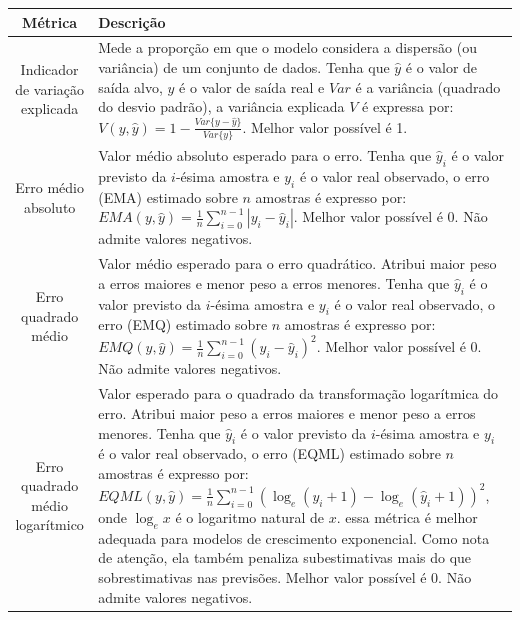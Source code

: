\begin{tabularx}{\linewidth}{c|X}
\caption{Métricas de avaliação do algoritmo de regressão.}\label{t.regression_metrics}\\
\toprule
\textbf{Métrica} & \textbf{Descrição}\\[6pt]
\midrule
\endhead
	{Indicador de variação explicada} & {Mede a proporção em que o modelo considera a dispersão (ou variância) de um conjunto de dados. Tenha que $\widehat{y}$ é o valor de saída alvo, $y$ é o valor de saída real e $Var$ é a variância (quadrado do desvio padrão), a variância explicada $V$ é expressa por: $V(y,\widehat{y}) = 1 - \frac{Var\{y-\widehat{y}\}}{Var\{y\}}$. Melhor valor possível é 1.}\\\hline

	{Erro médio absoluto} & {Valor médio absoluto esperado para o erro. Tenha que $\widehat{y}_i$ é o valor previsto da $i$-ésima amostra e $y_i$ é o valor real observado, o erro (EMA) estimado sobre $n$ amostras é expresso por: $EMA(y,\widehat{y}) = \frac{1}{n} \sum_{i=0}^{n-1} |y_i-\widehat{y}_i|$. Melhor valor possível é 0. Não admite valores negativos.}\\\hline

	{Erro quadrado médio} & {Valor médio esperado para o erro quadrático. Atribui maior peso a erros maiores e menor peso a erros menores. Tenha que $\widehat{y}_i$ é o valor previsto da $i$-ésima amostra e $y_i$ é o valor real observado, o erro (EMQ) estimado sobre $n$ amostras é expresso por: $EMQ(y,\widehat{y}) = \frac{1}{n} \sum_{i=0}^{n-1} (y_i-\widehat{y}_i)^2$. Melhor valor possível é 0. Não admite valores negativos.}\\\hline

	{Erro quadrado médio logarítmico} & {Valor esperado para o quadrado da transformação logarítmica do erro. Atribui maior peso a erros maiores e menor peso a erros menores. Tenha que $\widehat{y}_i$ é o valor previsto da $i$-ésima amostra e $y_i$ é o valor real observado, o erro (EQML) estimado sobre $n$ amostras é expresso por: $EQML(y,\widehat{y}) = \frac{1}{n} \sum_{i=0}^{n-1} (\log_{e}{(y_i + 1)}-\log_{e}{(\widehat{y}_i+1)})^2$, onde $\log_{e}{x}$ é o logaritmo natural de $x$. essa métrica é melhor adequada para modelos de crescimento exponencial. Como nota de atenção, ela também penaliza subestimativas mais do que sobrestimativas nas previsões. Melhor valor possível é 0. Não admite valores negativos.}\\\hline


\end{tabularx}
